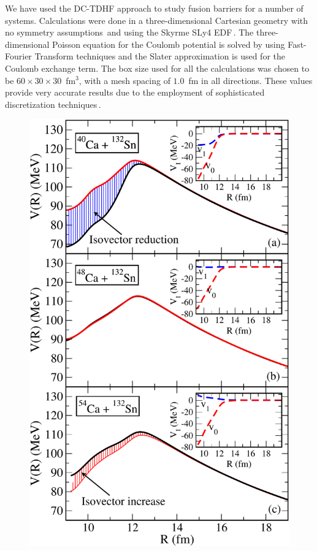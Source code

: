 We have used the DC-TDHF approach to study fusion barriers for a number of systems.
Calculations were done in a three-dimensional
Cartesian geometry with no symmetry assumptions\,\citep{umar2006c} and using the
Skyrme SLy4 EDF\,\citep{chabanat1998a}.
The three-dimensional Poisson equation for the Coulomb potential
is solved by using Fast-Fourier Transform techniques
and the Slater approximation is used for the Coulomb exchange term.
The box size used for all the calculations
was chosen to be $60\times 30\times 30$~fm$^3$, with a mesh spacing of
$1.0$~fm in all directions. These values provide very accurate
results due to the employment of sophisticated discretization
techniques\,\citep{umar1991a}.
\begin{figure}
	\includegraphics*[width=\textwidth]{../Figures/Isospin/V_Ca_Sn_stack.pdf}

\end{figure}
